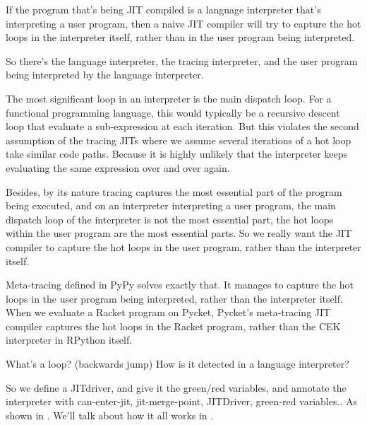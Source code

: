         \begin{paragraph-here}
            If the program that's being JIT compiled is a language interpreter that's interpreting a user program, then a naive JIT compiler will try to capture the hot loops in the interpreter itself, rather than in the user program being interpreted.

            So there's the language interpreter, the tracing interpreter, and the user program being interpreted by the language interpreter.

            The most significant loop in an interpreter is the main dispatch loop. For a functional programming language, this would typically be a recursive descent loop that evaluate a sub-expression at each iteration. But this violates the second assumption of the tracing JITs where we assume several iterations of a hot loop take similar code paths. Because it is highly unlikely that the interpreter keeps evaluating the same expression over and over again.
        \end{paragraph-here}

        \begin{paragraph-here}
            Besides, by its nature tracing captures the most essential part of the program being executed, and on an interpreter interpreting a user program, the main dispatch loop of the interpreter is not the most essential part, the hot loops within the user program are the most essential parts. So we really want the JIT compiler to capture the hot loops in the user program, rather than the interpreter itself.
        \end{paragraph-here}

        \begin{paragraph-here}
            Meta-tracing defined in PyPy \cite{pypy-main} solves exactly that. It manages to capture the hot loops in the user program being interpreted, rather than the interpreter itself. When we evaluate a Racket program on Pycket, Pycket's meta-tracing JIT compiler captures the hot loops in the Racket program, rather than the CEK interpreter in RPython itself.
        \end{paragraph-here}

        \begin{paragraph-here}
            What's a loop? (backwards jump) How is it detected in a language interpreter?
        \end{paragraph-here}

        \begin{paragraph-here}
            So we define a JITdriver, and give it the green/red variables, and annotate the interpreter with  can-enter-jit, jit-merge-point, JITDriver, green-red variables.. As shown in . We'll talk about how it all works in .
        \end{paragraph-here}

